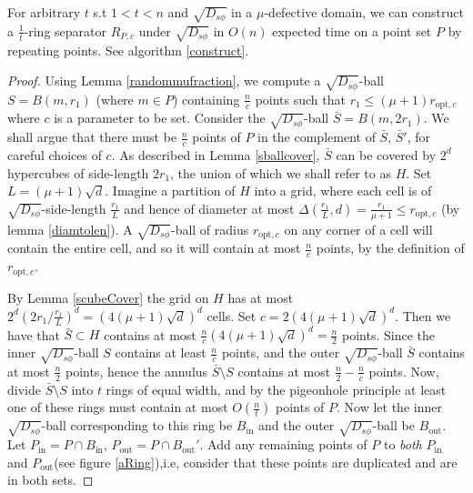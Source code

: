 \documentclass[11pt]{myclass}
\newcommand{\sbreg}{\ensuremath{D_{s\phi}}}
\begin{document}
\begin{lemma} \label{improvedRing}
For arbitrary $t$ s.t $1 < t < n$ and $\sqrt{\sbreg}$ in a $\mu$-defective domain, we can construct a $\frac{1}{t}$-ring separator $R_{P,c}$ under $\sqrt{\sbreg}$ in $O(n)$ expected time on a point set $P$ by repeating points. See algorithm \ref{construct}.
\end{lemma}
\begin{proof}


Using Lemma \ref{randommufraction}, we compute a $\sqrt{\sbreg}$-ball $S=B(m,r_1)$ (where $m \in P$) 
containing $\frac{n}{c}$ points such that $r_1 \leq (\mu+1)r_{\text{opt},c}$ where $c$ is a parameter to be set. 
Consider the $\sqrt{\sbreg}$-ball $\bar{S} = B(m,2r_1)$. We shall argue that there 
must be $\frac{n}{c}$ points of $P$ in the complement of $\bar{S}$, $\bar{S}'$, for careful choices of $c$.
As described in Lemma \ref{sballcover}, $\bar{S}$ can be covered by $2^d$ hypercubes of side-length 
$2 r_1$, the union of which we shall refer to as $H$. Set $L = (\mu+1)\sqrt{d}$.  Imagine a partition of $H$ 
into a grid, where each cell is of $\sqrt{\sbreg}$-side-length $\frac{r_1}{L}$ and hence of diameter at 
most $\Delta(\frac{r_1}{L}, d) = \frac{r_1}{\mu+1} \leq r_{\text{opt},c}$ (by lemma \ref{diamtolen}). 
A $\sqrt{\sbreg}$-ball of radius $r_{\text{opt},c}$ on any corner of a cell will contain the entire cell, and so it 
will contain at most $\frac{n}{c}$ points, by the definition of $r_{\text{opt},c}$. 

 By Lemma \ref{scubeCover} the grid on $H$ has at most $2^d(2r_1/\frac{r_1}{L})^d = (4 (\mu+1) \sqrt{d})^d$ cells.
 Set $c = 2(4 (\mu+1) \sqrt{d})^d$.  Then we have that $\bar{S} \subset H$ 
contains at most $\frac{n}{c} (4 (\mu+1) \sqrt{d})^d  = \frac{n}{2}$ points.  
Since the inner $\sqrt{\sbreg}$-ball $S$ contains at least $\frac{n}{c}$ points, and the outer $\sqrt{\sbreg}$-ball $\bar{S}$ 
contains at most $\frac{n}{2}$ points, hence the annulus $\bar{S} \setminus S$ contains at most 
$\frac{n}{2} - \frac{n}{c}$ points. Now, divide $\bar{S} \setminus S$ into $t$ rings of equal width, 
and by the pigeonhole principle at least one of these rings must contain at most $ O(\frac{n}{t})$ 
points of $P$. Now let the inner $\sqrt{\sbreg}$-ball corresponding to this ring be $B_{\text{in}}$ and the outer 
$\sqrt{\sbreg}$-ball 
be $B_{\text{out}}$. Let $P_{\text{in}} = P \cap B_{\text{in}}$, $P_{\text{out}} = P \cap B_{\text{out}}'$. Add any remaining points of $P$ to \emph{both} $P_{\text{in}}$ and $P_{\text{out}}$(see figure \ref{aRing}),i.e,
consider that these points are duplicated and are in both sets. 



\end{proof}
\end{document}
